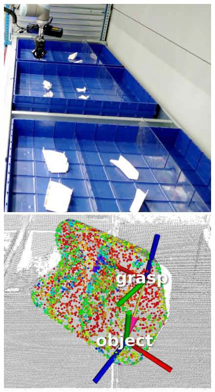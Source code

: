 \begin{figure}[h!]
{\begin{tcolorbox}
	\includegraphics[height=.15\textheight]{Cap5/Figuras/picking_embraer/side-1}\\
	\includegraphics[height=.15\textheight]{Cap5/Figuras/picking_embraer/perception-2}

\end{tcolorbox}}
\end{figure}
